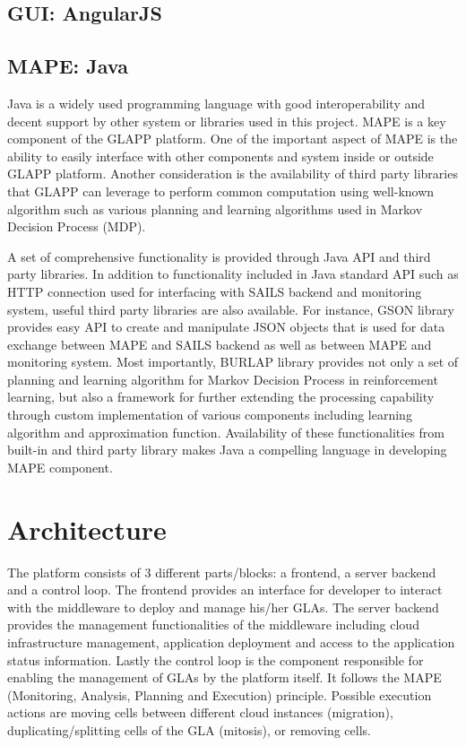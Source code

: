 \documentclass{seal_thesis}
\begin{document}
\subsection{GUI: AngularJS}

\subsection{MAPE: Java}
Java is a widely used programming language with good interoperability and decent support by other system or libraries used in this project.
MAPE is a key component of the GLAPP platform.
One of the important aspect of MAPE is the ability to easily interface with other components and system inside or outside GLAPP platform.
Another consideration is the availability of third party libraries that GLAPP can leverage to perform common computation using well-known algorithm such as various planning and learning algorithms used in Markov Decision Process (MDP).

A set of comprehensive functionality is provided through Java API and third party libraries.
In addition to functionality included in Java standard API such as HTTP connection used for interfacing with SAILS backend and monitoring system, useful third party libraries are also available.
For instance, GSON library  provides easy API to create and manipulate JSON objects that is used for data exchange between MAPE and SAILS backend as well as between MAPE and monitoring system.
Most importantly, BURLAP library  provides not only a set of planning and learning algorithm for Markov Decision Process in reinforcement learning, but also a framework for further extending the processing capability through custom implementation of various components including learning algorithm and approximation function.
Availability of these functionalities from built-in and third party library makes Java a compelling language in developing MAPE component.


\section{Architecture}
The platform consists of 3 different parts/blocks: a frontend, a server backend and a control loop.
The frontend provides an interface for developer to interact with the middleware to deploy and manage his/her GLAs.
The server backend provides the management functionalities of the middleware including cloud infrastructure management, application deployment and access to the application status information.
Lastly the control loop is the component responsible for enabling the management of GLAs by the platform itself.
It follows the MAPE (Monitoring, Analysis, Planning and Execution) principle.
Possible execution actions are moving cells between different cloud instances (migration), duplicating/splitting cells of the GLA (mitosis), or removing cells.
\end{document}

